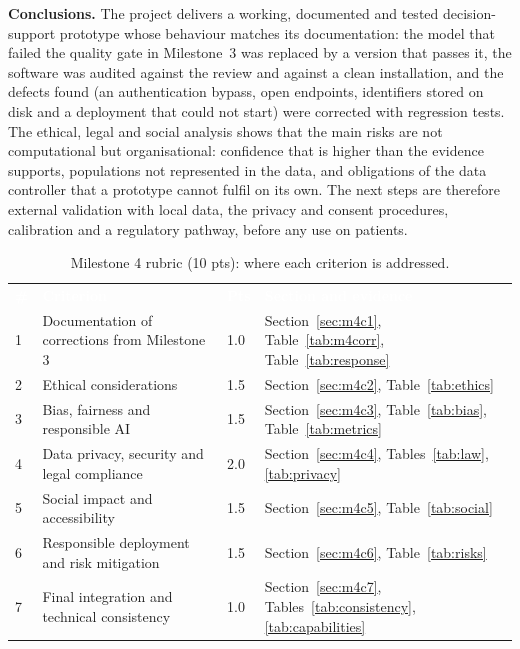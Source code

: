 \documentclass[12pt,a4paper]{article}
\newcommand{\hd}[1]{\textcolor{white}{\textbf{#1}}}
\begin{document}
\noindent\textbf{Conclusions.} The project delivers a working, documented and tested decision-support prototype whose behaviour matches its documentation: the model that failed the quality gate in Milestone~3 was
replaced by a version that passes it, the software was audited against the review and against a clean installation, and the defects found (an authentication bypass, open endpoints, identifiers stored on disk and a
deployment that could not start) were corrected with regression tests. The ethical, legal and social analysis shows that the main risks are not computational but organisational: confidence that is higher than the evidence
supports, populations not represented in the data, and obligations of the data controller that a prototype cannot fulfil on its own. The next steps are therefore external validation with local data, the privacy and consent
procedures, calibration and a regulatory pathway, before any use on patients.

\begin{table}[H]
\centering
\caption{Milestone 4 rubric (10 pts): where each criterion is addressed.}
\label{tab:m4rubric}
\renewcommand{\arraystretch}{1.3}
\begin{tabularx}{\textwidth}{C{0.4cm} L{4.6cm} C{0.8cm} Y}
\hd{\#} & \hd{Criterion} & \hd{Pts} & \hd{Section and evidence} \\
1 & Documentation of corrections from Milestone 3 & 1.0 & Section~\ref{sec:m4c1}, Table~\ref{tab:m4corr}, Table~\ref{tab:response} \\
2 & Ethical considerations & 1.5 & Section~\ref{sec:m4c2}, Table~\ref{tab:ethics} \\
3 & Bias, fairness and responsible AI & 1.5 & Section~\ref{sec:m4c3}, Table~\ref{tab:bias}, Table~\ref{tab:metrics} \\
4 & Data privacy, security and legal compliance & 2.0 & Section~\ref{sec:m4c4}, Tables~\ref{tab:law}, \ref{tab:privacy} \\
5 & Social impact and accessibility & 1.5 & Section~\ref{sec:m4c5}, Table~\ref{tab:social} \\
6 & Responsible deployment and risk mitigation & 1.5 & Section~\ref{sec:m4c6}, Table~\ref{tab:risks} \\
7 & Final integration and technical consistency & 1.0 & Section~\ref{sec:m4c7}, Tables~\ref{tab:consistency}, \ref{tab:capabilities} \\
\end{tabularx}
\end{table}
\end{document}
